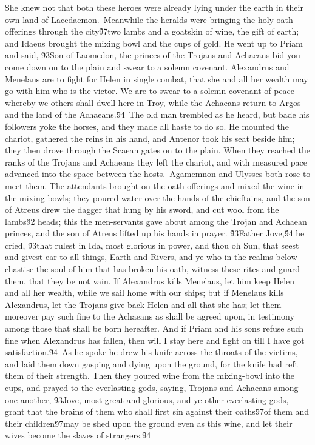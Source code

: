 {She knew not that both these heroes were already lying under the earth in their own land of Lacedaemon.\
Meanwhile the heralds were bringing the holy oath-offerings through the city\'97two lambs and a goatskin of wine, the gift of earth; and Idaeus brought the mixing bowl and the cups of gold. He went up to Priam and said, \'93Son of Laomedon, the princes of the Trojans and Achaeans bid you come down on to the plain and swear to a solemn covenant. Alexandrus and Menelaus are to fight for Helen in single combat, that she and all her wealth may go with him who is the victor. We are to swear to a solemn covenant of peace whereby we others shall dwell here in Troy, while the Achaeans return to Argos and the land of the Achaeans.\'94\
The old man trembled as he heard, but bade his followers yoke the horses, and they made all haste to do so. He mounted the chariot, gathered the reins in his hand, and Antenor took his seat beside him; they then drove through the Scaean gates on to the plain. When they reached the ranks of the Trojans and Achaeans they left the chariot, and with measured pace advanced into the space between the hosts.\
Agamemnon and Ulysses both rose to meet them. The attendants brought on the oath-offerings and mixed the wine in the mixing-bowls; they poured water over the hands of the chieftains, and the son of Atreus drew the dagger that hung by his sword, and cut wool from the lambs\'92 heads; this the men-servants gave about among the Trojan and Achaean princes, and the son of Atreus lifted up his hands in prayer. \'93Father Jove,\'94 he cried, \'93that rulest in Ida, most glorious in power, and thou oh Sun, that seest and givest ear to all things, Earth and Rivers, and ye who in the realms below chastise the soul of him that has broken his oath, witness these rites and guard them, that they be not vain. If Alexandrus kills Menelaus, let him keep Helen and all her wealth, while we sail home with our ships; but if Menelaus kills Alexandrus, let the Trojans give back Helen and all that she has; let them moreover pay such fine to the Achaeans as shall be agreed upon, in testimony among those that shall be born hereafter. And if Priam and his sons refuse such fine when Alexandrus has fallen, then will I stay here and fight on till I have got satisfaction.\'94\
As he spoke he drew his knife across the throats of the victims, and laid them down gasping and dying upon the ground, for the knife had reft them of their strength. Then they poured wine from the mixing-bowl into the cups, and prayed to the everlasting gods, saying, Trojans and Achaeans among one another, \'93Jove, most great and glorious, and ye other everlasting gods, grant that the brains of them who shall first sin against their oaths\'97of them and their children\'97may be shed upon the ground even as this wine, and let their wives become the slaves of strangers.\'94\
}
